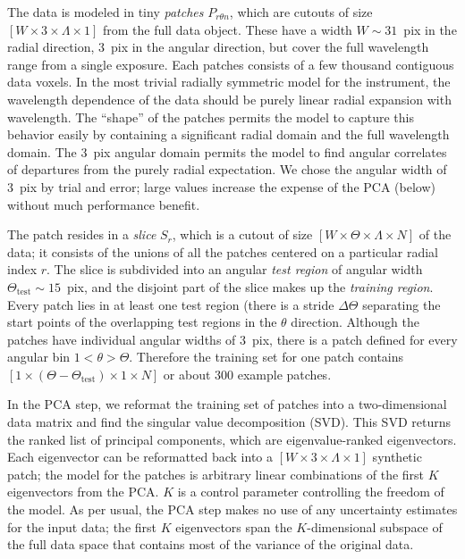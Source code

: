 \documentclass[12pt,pdftex,preprint]{aastex}
\newcommand{\test}{\mathrm{test}}
\begin{document}
The data is modeled in tiny \emph{patches} $P_{r \theta n}$, which are
cutouts of size $[W\times 3\times\Lambda\times 1]$ from the full data
object.  These have a width $W\sim 31$~pix in the radial direction,
3~pix in the angular direction, but cover the full wavelength range
from a single exposure.  Each patches consists of a few thousand
contiguous data voxels.  In the most trivial radially symmetric model
for the instrument, the wavelength dependence of the data should be
purely linear radial expansion with wavelength.  The ``shape'' of the
patches permits the model to capture this behavior easily by
containing a significant radial domain and the full wavelength domain.
The 3~pix angular domain permits the model to find angular correlates
of departures from the purely radial expectation.  We chose the
angular width of 3~pix by trial and error; large values increase the
expense of the PCA (below) without much performance benefit.

The patch resides in a \emph{slice} $S_r$, which is a cutout of size
$[W\times\Theta\times\Lambda\times N]$ of the data; it consists of the
unions of all the patches centered on a particular radial index $r$.
The slice is subdivided into an angular \emph{test region} of angular
width $\Theta_\test\sim 15$~pix, and the disjoint part of the slice
makes up the \emph{training region}.  Every patch lies in at least one
test region (there is a stride $\Delta\Theta$ separating the start
points of the overlapping test regions in the $\theta$ direction.
Although the patches have individual angular widths of 3~pix, there is
a patch defined for every angular bin $1 < \theta > \Theta$.
Therefore the training set for one patch contains
$[1\times(\Theta-\Theta_\test)\times 1\times N]$ or about 300 example
patches.

In the PCA step, we reformat the training set of patches into a
two-dimensional data matrix and find the singular value decomposition
(SVD).  This SVD returns the ranked list of principal components,
which are eigenvalue-ranked eigenvectors.  Each eigenvector can be
reformatted back into a $[W\times 3\times\Lambda\times 1]$ synthetic
patch; the model for the patches is arbitrary linear combinations of
the first $K$ eigenvectors from the PCA.  $K$ is a control parameter
controlling the freedom of the model.  As per usual, the PCA step
makes no use of any uncertainty estimates for the input data; the
first $K$ eigenvectors span the $K$-dimensional subspace of the full
data space that contains most of the variance of the original data.
\end{document}
